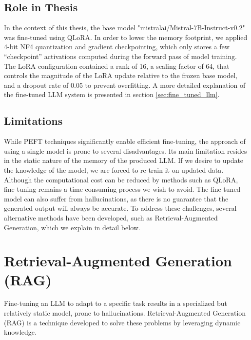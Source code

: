 \subsection{Role in Thesis}

In the context of this thesis, the base model "mistralai/Mistral-7B-Instruct-v0.2" was fine-tuned using QLoRA. In order to lower the memory footprint, we applied 4-bit NF4 quantization and gradient checkpointing, which only stores a few “checkpoint” activations computed during the forward pass of model training. The LoRA configuration contained a rank of 16, a scaling factor of 64, that controls the magnitude of the LoRA update relative to the frozen base model, and a dropout rate of 0.05 to prevent overfitting. A more detailed explanation of the fine-tuned LLM system is presented in section \ref{sec:fine_tuned_llm}.

\subsection{Limitations}

While PEFT techniques significantly enable efficient fine-tuning, the approach of using a single model is prone to several disadvantages. Its main limitation resides in the static nature of the memory of the produced LLM. If we desire to update the knowledge of the model, we are forced to re-train it on updated data. Although the computational cost can be reduced by methods such as QLoRA, fine-tuning remains a time-consuming process we wish to avoid. The fine-tuned model can also suffer from hallucinations, as there is no guarantee that the generated output will always be accurate. To address these challenges, several alternative methods have been developed, such as  Retrieval-Augmented Generation, which we explain in detail below.



\section{Retrieval-Augmented Generation (RAG)}
\label{sec:lit_rag}

Fine-tuning an LLM to adapt to a specific task results in a specialized but relatively static model, prone to hallucinations. Retrieval-Augmented Generation (RAG) is a technique developed to solve these problems by leveraging dynamic knowledge.


